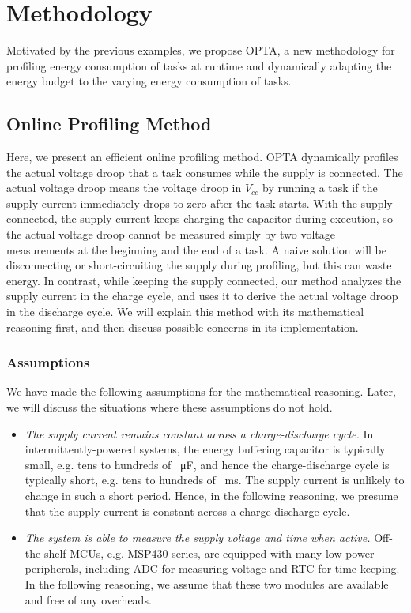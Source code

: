 \newpage
\section{Methodology}

Motivated by the previous examples, we propose OPTA, a new methodology for profiling energy consumption of tasks at runtime and dynamically adapting the energy budget to the varying energy consumption of tasks. 

\subsection{Online Profiling Method}

Here, we present an efficient online profiling method. 
OPTA dynamically profiles the actual voltage droop that a task consumes while the supply is connected. 
The actual voltage droop means the voltage droop in ${V_{cc}}$ by running a task if the supply current immediately drops to zero after the task starts. 
With the supply connected, the supply current keeps charging the capacitor during execution, so the actual voltage droop cannot be measured simply by two voltage measurements at the beginning and the end of a task. 
A naive solution will be disconnecting or short-circuiting the supply during profiling, but this can waste energy. 
In contrast, while keeping the supply connected, our method analyzes the supply current in the charge cycle, and uses it to derive the actual voltage droop in the discharge cycle. 
We will explain this method with its mathematical reasoning first, and then discuss possible concerns in its implementation. 

\subsubsection{Assumptions}

We have made the following assumptions for the mathematical reasoning. Later, we will discuss the situations where these assumptions do not hold.

\begin{itemize}
    \item \textit{The supply current remains constant across a charge-discharge cycle.} 
    In intermittently-powered systems, the energy buffering capacitor is typically small, e.g. tens to hundreds of \SI{}{\micro\farad}, and hence the charge-discharge cycle is typically short, e.g. tens to hundreds of \SI{}{\milli\second}. 
    The supply current is unlikely to change in such a short period. 
    Hence, in the following reasoning, we presume that the supply current is constant across a charge-discharge cycle. 

    \item \textit{The system is able to measure the supply voltage and time when active.} Off-the-shelf MCUs, e.g. MSP430 series, are equipped with many low-power peripherals, including ADC for measuring voltage and RTC for time-keeping. 
    In the following reasoning, we assume that these two modules are available and free of any overheads.
\end{itemize}

